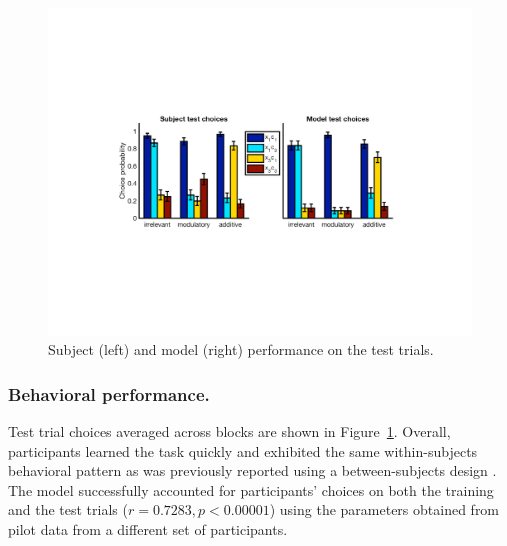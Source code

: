 \documentclass[10pt,letterpaper]{article}
\begin{document}
\begin{figure}[ht]
\begin{center}
\includegraphics[scale=0.45,  trim = 120 220 120 200]{behavioral.pdf}
\end{center}
\caption{Subject (left) and model (right) performance on the test trials.} 
\label{behavioral}
\end{figure}

\subsubsection{Behavioral performance.}

Test trial choices averaged across blocks are shown in Figure~\ref{behavioral}. Overall, participants learned the task quickly and exhibited the same within-subjects behavioral pattern as was previously reported using a between-subjects design \cite{Gershman2017}. The model successfully accounted for participants' choices on both the training and the test trials ($r = 0.7283, p < 0.00001$) using the parameters obtained from pilot data from a different set of participants.
\end{document}

